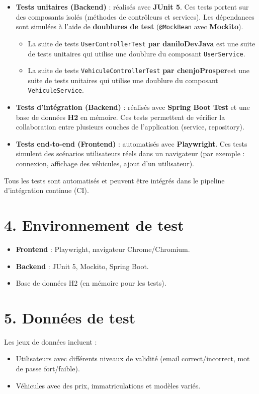 \documentclass[a4paper,12pt]{article}
\begin{document}
\begin{itemize}
    \item \textbf{Tests unitaires (Backend)} : réalisés avec \textbf{JUnit 5}. Ces tests portent sur des composants isolés (méthodes de contrôleurs et services). Les dépendances sont simulées à l’aide de \textbf{doublures de test} (\texttt{@MockBean} avec \textbf{Mockito}).
    
    \begin{itemize}
        \item La suite de tests \texttt{UserControllerTest} \textbf{par daniloDevJava} est une suite de tests unitaires qui utilise une doublure du composant \texttt{UserService}.
        \item La suite de tests \texttt{VehiculeControllerTest} \textbf{par chenjoProsper}est une suite de tests unitaires qui utilise une doublure du composant \texttt{VehiculeService}.
    \end{itemize}
    
    \item \textbf{Tests d'intégration (Backend)} : réalisés avec \textbf{Spring Boot Test} et une base de données \textbf{H2} en mémoire. Ces tests permettent de vérifier la collaboration entre plusieurs couches de l'application (service, repository).

    \item \textbf{Tests end-to-end (Frontend)} : automatisés avec \textbf{Playwright}. Ces tests simulent des scénarios utilisateurs réels dans un navigateur (par exemple : connexion, affichage des véhicules, ajout d’un utilisateur).

\end{itemize}

Tous les tests sont automatisés et peuvent être intégrés dans le pipeline d’intégration continue (CI).


\section*{4. Environnement de test}
\begin{itemize}
    \item \textbf{Frontend} : Playwright, navigateur Chrome/Chromium.
    \item \textbf{Backend} : JUnit 5, Mockito, Spring Boot.
    \item Base de données H2 (en mémoire pour les tests).
\end{itemize}

\section*{5. Données de test}
Les jeux de données incluent :
\begin{itemize}
    \item Utilisateurs avec différents niveaux de validité (email correct/incorrect, mot de passe fort/faible).
    \item Véhicules avec des prix, immatriculations et modèles variés.
\end{itemize}
\end{document}
